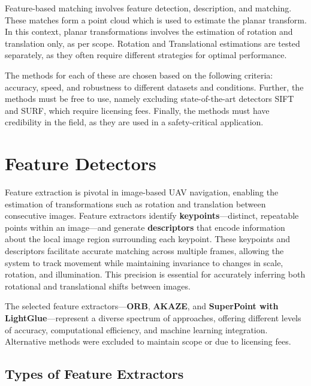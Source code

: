 Feature-based matching involves feature detection, description, and matching. These matches form a point cloud which is used to estimate the planar transform. In this context, planar transformations involves the estimation of rotation and translation only, as per scope. Rotation and Translational estimations are tested separately, as they often require different strategies for optimal performance.  

The methods for each of these are chosen based on the following criteria: accuracy, speed, and robustness to different datasets and conditions. Further, the methods must be free to use, namely excluding state-of-the-art detectors SIFT and SURF, which require licensing fees. Finally, the methods must have credibility in the field, as they are used in a safety-critical application.








\section{Feature Detectors}

Feature extraction is pivotal in image-based UAV navigation, enabling the estimation of transformations such as rotation and translation between consecutive images. Feature extractors identify \textbf{keypoints}—distinct, repeatable points within an image—and generate \textbf{descriptors} that encode information about the local image region surrounding each keypoint. These keypoints and descriptors facilitate accurate matching across multiple frames, allowing the system to track movement while maintaining invariance to changes in scale, rotation, and illumination. This precision is essential for accurately inferring both rotational and translational shifts between images.

The selected feature extractors—\textbf{ORB}, \textbf{AKAZE}, and \textbf{SuperPoint with LightGlue}—represent a diverse spectrum of approaches, offering different levels of accuracy, computational efficiency, and machine learning integration. Alternative methods were excluded to maintain scope or due to licensing fees. 

\subsection{Types of Feature Extractors}

